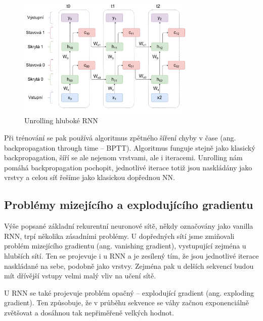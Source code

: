 \begin{figure}[]
    \centering
    \includegraphics[width=0.75\textwidth]{Figures/BPTT.pdf}
    \caption{Unrolling hluboké RNN}
    \label{fig:bptt}
\end{figure}

Při trénování se pak používá algoritmus zpětného šíření chyby v čase (ang.
backpropagation through time – BPTT). Algoritmus funguje stejně jako klasický
backpropagation, šíří se ale nejenom vrstvami, ale i iteracemi. Unrolling nám
pomáhá backpropagation pochopit, jednotlivé iterace totiž jsou naskládány jako
vrstvy a celou síť řešíme jako klasickou dopřednou NN.

\subsection{Problémy mizejícího a explodujícího gradientu}

Výše popsané základní rekurentní neuronové sítě, někdy označovány jako vanilla
RNN, trpí několika zásadními problémy. U dopředných sítí jsme zmiňovali problém
mizejícího gradientu (ang. vanishing gradient), vystupující zejména u hlubších
sítí. Ten se projevuje i u RNN a je zesílený tím, že jsou jednotlivé iterace
naskládané na sebe, podobně jako vrstvy. Zejména pak u delších sekvencí budou
mít dřívější vstupy velmi malý vliv na učení sítě.

U RNN se také projevuje problém opačný – explodující gradient (ang. exploding
gradient). Ten způsobuje, že v průběhu sekvence se váhy začnou exponenciálně
zvětšovat a dosáhnou tak nepřiměřeně velkých hodnot.

